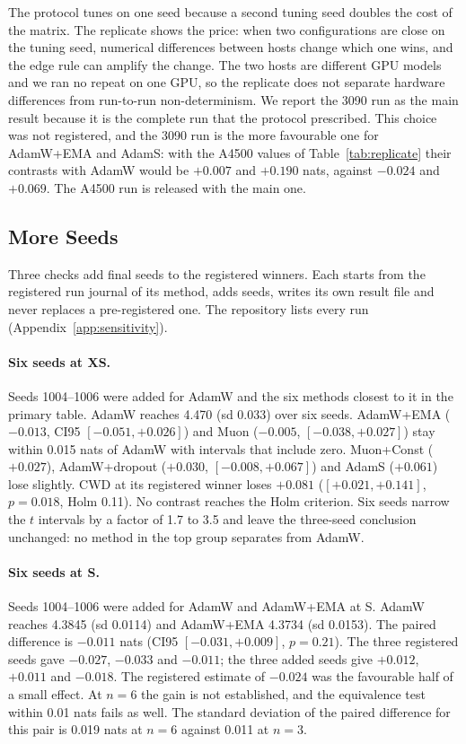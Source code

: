 \documentclass[twoside,11pt]{article}
\begin{document}
The protocol tunes on one seed because a second tuning seed doubles the cost of the matrix. The replicate shows the price: when two configurations are close on the tuning seed, numerical differences between hosts change which one wins, and the edge rule can amplify the change. The two hosts are different GPU models and we ran no repeat on one GPU, so the replicate does not separate hardware differences from run-to-run non-determinism. We report the 3090 run as the main result because it is the complete run that the protocol prescribed. This choice was not registered, and the 3090 run is the more favourable one for AdamW+EMA and AdamS: with the A4500 values of Table~\ref{tab:replicate} their contrasts with AdamW would be $+0.007$ and $+0.190$ nats, against $-0.024$ and $+0.069$. The A4500 run is released with the main one.

\subsection{More Seeds}
\label{sec:seeds}

Three checks add final seeds to the registered winners. Each starts from the registered run journal of its method, adds seeds, writes its own result file and never replaces a pre-registered one. The repository lists every run (Appendix~\ref{app:sensitivity}).

\paragraph{Six seeds at XS.}
Seeds 1004--1006 were added for AdamW and the six methods closest to it in the primary table. AdamW reaches 4.470 (sd 0.033) over six seeds. AdamW+EMA ($-0.013$, CI95 $[-0.051, +0.026]$) and Muon ($-0.005$, $[-0.038, +0.027]$) stay within 0.015 nats of AdamW with intervals that include zero. Muon+Const ($+0.027$), AdamW+dropout ($+0.030$, $[-0.008, +0.067]$) and AdamS ($+0.061$) lose slightly. CWD at its registered winner loses $+0.081$ ($[+0.021, +0.141]$, $p = 0.018$, Holm 0.11). No contrast reaches the Holm criterion. Six seeds narrow the $t$ intervals by a factor of 1.7 to 3.5 and leave the three-seed conclusion unchanged: no method in the top group separates from AdamW.

\paragraph{Six seeds at S.}
Seeds 1004--1006 were added for AdamW and AdamW+EMA at S. AdamW reaches 4.3845 (sd 0.0114) and AdamW+EMA 4.3734 (sd 0.0153). The paired difference is $-0.011$ nats (CI95 $[-0.031, +0.009]$, $p = 0.21$). The three registered seeds gave $-0.027$, $-0.033$ and $-0.011$; the three added seeds give $+0.012$, $+0.011$ and $-0.018$. The registered estimate of $-0.024$ was the favourable half of a small effect. At $n = 6$ the gain is not established, and the equivalence test within 0.01 nats fails as well. The standard deviation of the paired difference for this pair is 0.019 nats at $n = 6$ against 0.011 at $n = 3$.
\end{document}
